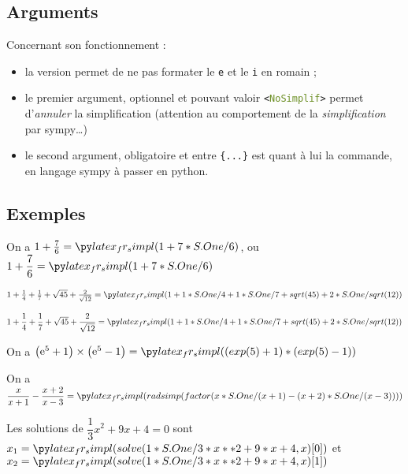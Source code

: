 \documentclass[french,a4paper,11pt]{article}
\newcommand\Cle[1]{{\bfseries\sffamily\textlangle #1\textrangle}}
\begin{document}
\subsection{Arguments}

\begin{tipblock}
Concernant son fonctionnement :

\begin{itemize}
	\item la version \Cle{*} permet de ne pas formater le \texttt{e} et le \texttt{i} en \textsf{romain} ;
	\item le premier argument, optionnel et pouvant valoir \texttt{<\textcolor{OliveDrab}{NoSimplif}>} permet d'\textit{annuler} la simplification (attention au comportement de la \textit{simplification} par \textsf{sympy}\ldots)
	\item le second argument, obligatoire et entre \texttt{\{...\}} est quant à lui la commande, en langage \textsf{sympy} à passer en \textsf{python}.
\end{itemize}
\vspace*{-\baselineskip}\leavevmode
\end{tipblock}

\subsection{Exemples}

\begin{bloctext}
On a $1+\frac76 = \sympycalc{1+7/6}$, ou $1+\dfrac76 = \dsympycalc{1+7/6}$
\end{bloctext}

\begin{bloctext}
$1+\frac14+\frac17 + \sqrt{45} + \frac{2}{\sqrt{12}} =
\sympycalc{1+1/4+1/7+sqrt(45)+2/sqrt(12)}$

$1+\dfrac14+\dfrac17 + \sqrt{45} + \dfrac{2}{\sqrt{12}} =
\dsympycalc{1+1/4+1/7+sqrt(45)+2/sqrt(12)}$
\end{bloctext}

\begin{bloctext}
On a $\left(\e^5 +1 \right) \times \left(\e^5-1 \right) = \sympycalc{(exp(5)+1)*(exp(5)-1)}$
\end{bloctext}

\begin{bloctext}
On a $\dfrac{x}{x+1} - \dfrac{x+2}{x-3} = \dsympycalc{radsimp(factor(x/(x+1) - (x+2)/(x-3)))}$
\end{bloctext}

\begin{bloctext}
Les solutions de $\dfrac13x^2+9x+4=0$ sont
$x_1 = \dsympycalc{solve(1/3*x**2+9*x+4,x)[0]}$ et
$x_2 = \dsympycalc{solve(1/3*x**2+9*x+4,x)[1]}$
\end{bloctext}
\end{document}
